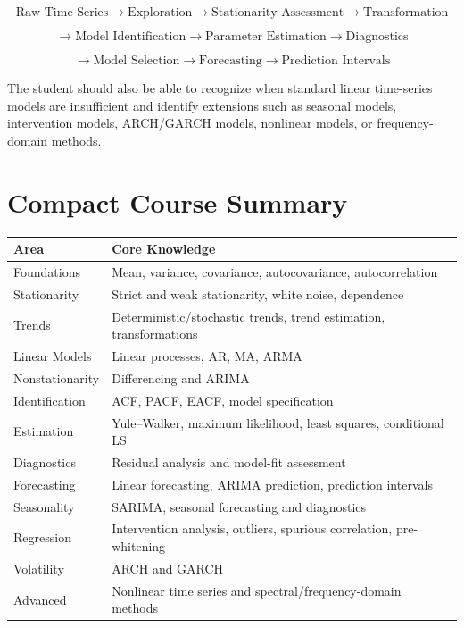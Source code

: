 \documentclass[11pt]{article}
\begin{document}
\[
\boxed{
\text{Raw Time Series}
\rightarrow
\text{Exploration}
\rightarrow
\text{Stationarity Assessment}
\rightarrow
\text{Transformation}
}
\]

\[
\boxed{
\rightarrow
\text{Model Identification}
\rightarrow
\text{Parameter Estimation}
\rightarrow
\text{Diagnostics}
}
\]

\[
\boxed{
\rightarrow
\text{Model Selection}
\rightarrow
\text{Forecasting}
\rightarrow
\text{Prediction Intervals}
}
\]

The student should also be able to recognize when standard linear
time-series models are insufficient and identify extensions such as
seasonal models, intervention models, ARCH/GARCH models, nonlinear
models, or frequency-domain methods.

\section{Compact Course Summary}

\begin{center}
\begin{tabular}{p{}p{}}
\toprule
\textbf{Area} & \textbf{Core Knowledge} \\
\midrule
Foundations &
Mean, variance, covariance, autocovariance, autocorrelation \\

Stationarity &
Strict and weak stationarity, white noise, dependence \\

Trends &
Deterministic/stochastic trends, trend estimation, transformations \\

Linear Models &
Linear processes, AR, MA, ARMA \\

Nonstationarity &
Differencing and ARIMA \\

Identification &
ACF, PACF, EACF, model specification \\

Estimation &
Yule--Walker, maximum likelihood, least squares, conditional LS \\

Diagnostics &
Residual analysis and model-fit assessment \\

Forecasting &
Linear forecasting, ARIMA prediction, prediction intervals \\

Seasonality &
SARIMA, seasonal forecasting and diagnostics \\

Regression &
Intervention analysis, outliers, spurious correlation, pre-whitening \\

Volatility &
ARCH and GARCH \\

Advanced &
Nonlinear time series and spectral/frequency-domain methods \\
\bottomrule
\end{tabular}
\end{center}
\end{document}
